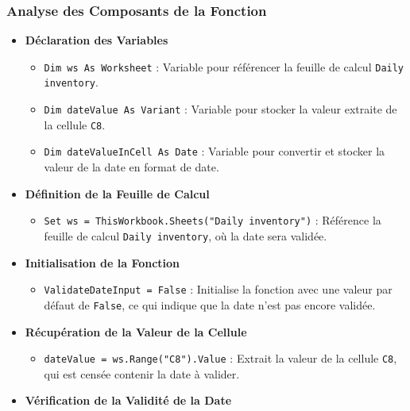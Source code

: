 \documentclass[a4paper, oneside, 12pt, final]{extreport}
\begin{document}
\subsubsection{Analyse des Composants de la Fonction}
\begin{itemize}

\item\textbf{Déclaration des Variables}

\begin{itemize}
    \item \texttt{Dim ws As Worksheet} : Variable pour référencer la feuille de calcul \texttt{Daily inventory}.
    \item \texttt{Dim dateValue As Variant} : Variable pour stocker la valeur extraite de la cellule \texttt{C8}.
    \item \texttt{Dim dateValueInCell As Date} : Variable pour convertir et stocker la valeur de la date en format de date.
\end{itemize}

\item\textbf{Définition de la Feuille de Calcul}

\begin{itemize}
    \item \texttt{Set ws = ThisWorkbook.Sheets("Daily inventory")} : Référence la feuille de calcul \texttt{Daily inventory}, où la date sera validée.
\end{itemize}

\item\textbf{Initialisation de la Fonction}

\begin{itemize}
    \item \texttt{ValidateDateInput = False} : Initialise la fonction avec une valeur par défaut de \texttt{False}, ce qui indique que la date n'est pas encore validée.
\end{itemize}

\item\textbf{Récupération de la Valeur de la Cellule}

\begin{itemize}
    \item \texttt{dateValue = ws.Range("C8").Value} : Extrait la valeur de la cellule \texttt{C8}, qui est censée contenir la date à valider.
\end{itemize}

\item\textbf{Vérification de la Validité de la Date}


\end{itemize}
\end{document}
